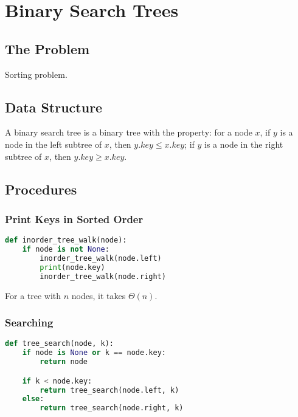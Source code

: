 \documentclass[11pt]{article}
\begin{document}
\section{Binary Search Trees}

\subsection{The Problem}

Sorting problem.

\subsection{Data Structure}

A binary search tree is a binary tree with the property: for a node $x$, if $y$ is a
node in the left subtree of $x$, then $y.key \leq x.key$; if $y$ is a node in the
right subtree of $x$, then $y.key \geq x.key$.

\subsection{Procedures}

\subsubsection{Print Keys in Sorted Order}

\begin{lstlisting}[language=Python]
def inorder_tree_walk(node):
    if node is not None:
        inorder_tree_walk(node.left)
        print(node.key)
        inorder_tree_walk(node.right)
\end{lstlisting}

\begin{rtime*}
For a tree with $n$ nodes, it takes $\Theta(n)$.
\end{rtime*}

\subsubsection{Searching}

\begin{lstlisting}[language=Python]
def tree_search(node, k):
    if node is None or k == node.key:
        return node

    if k < node.key:
        return tree_search(node.left, k)
    else:
        return tree_search(node.right, k)
\end{lstlisting}
\end{document}
